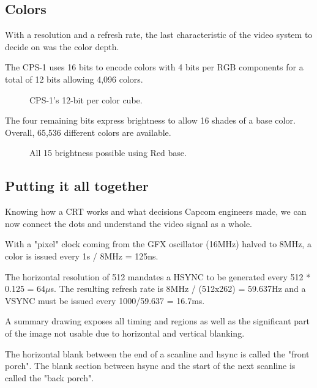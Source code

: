 \subsection{Colors}
With a resolution and a refresh rate, the last characteristic of the video system to decide on was the color depth. 

The CPS-1 uses 16 bits to encode colors with 4 bits per RGB components for a total of 12 bits allowing 4,096 colors. 


\begin{figure}[H]
\begin{minipage}[t]{0.49\linewidth}
\end{minipage}%
\hfill%
\begin{minipage}[t]{0.49\linewidth}
\end{minipage}
\caption*{CPS-1's 12-bit per color cube.}
\end{figure}
  
The four remaining bits express brightness to allow 16 shades of a base color. Overall, 65,536 different colors are available.

\begin{figure}[H]
\caption*{All 15 brightness possible using Red  base.}
\end{figure}

\subsection{Putting it all together}

Knowing how a CRT works and what decisions Capcom engineers made, we can now connect the dots and understand the video signal as a whole.

With a "pixel" clock coming from the GFX oscillator (16MHz) halved to 8MHz, a color is issued every 1s / 8MHz = 125ns.

The horizontal resolution of 512 mandates a HSYNC to be generated every 512 * 0.125 = 64$\mu$s. The resulting refresh rate is 8MHz / (512x262) = 59.637Hz and a VSYNC must be issued every 1000/59.637 = 16.7ms.

A summary drawing exposes all timing and regions as well as the significant part of the image not usable due to horizontal and vertical blanking.

\begin{trivia}
The horizontal blank between the end of a scanline and hsync is called the "front porch". The blank section between hsync and the start of the next scanline is called the "back porch".
\end{trivia}

